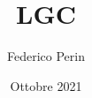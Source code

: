 



\title{\textbf{LGC}}
\author{Federico Perin}

\date{Ottobre 2021}




\makeFrontPage


\tableofcontents



